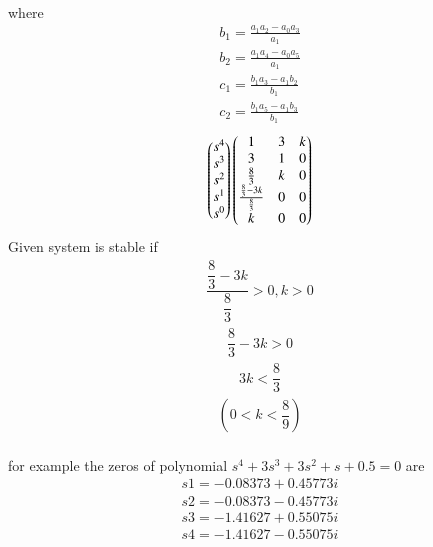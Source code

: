 \begin{enumerate}[label=\thesubsection.\arabic*.,ref=\thesubsection.\theenumi]
 \\
 where
 \begin{align}
 b_1 =\frac{ a_1a_2-a_0a_3}{a_1}  
 \\
 b_2 =\frac{ a_1a_4-a_0a_5}{a_1} 
 \\
 c_1=\frac{ b_1a_3-a_1b_2}{b_1} 
\\
 c_2=\frac{ b_1a_5-a_1b_3}{b_1}  
\end{align}
\bigskip
\begin{align}
\begin{pmatrix}s^4\\s^3\\s^2\\s^1 \\ s^0\end{pmatrix}
\begin{pmatrix}1 & 3 & k \\ 3 & 1 & 0\\  \frac{8}{3}& k & 0\\ \frac{\frac{8}{3}-3k}{\frac{8}{3}} & 0 & 0\\k & 0 & 0\end{pmatrix} 
\end{align}
Given system is stable if
\begin{align}
\dfrac{\dfrac{8}{3}-3k}{\dfrac{8}{3}}>0  ,  k>0
\end{align}
\begin{align}
{\dfrac{8}{3}-3k} >0
\end{align}
\begin{align}
3k<\dfrac{8}{3}
\end{align}
\begin{align}
(0<k<\dfrac{8}{9})
\end{align}
\bigskip
\\for example the zeros of polynomial $s^4+3s^3+3s^2+s+0.5=0$ are 
\begin{align}
s1=-0.08373+0.45773i
\end{align}
\begin{align}
s2=-0.08373-0.45773i
\end{align}
\begin{align}
s3=-1.41627+0.55075i
\end{align}
\begin{align}
s4=-1.41627-0.55075i
\end{align}

\end{enumerate}

